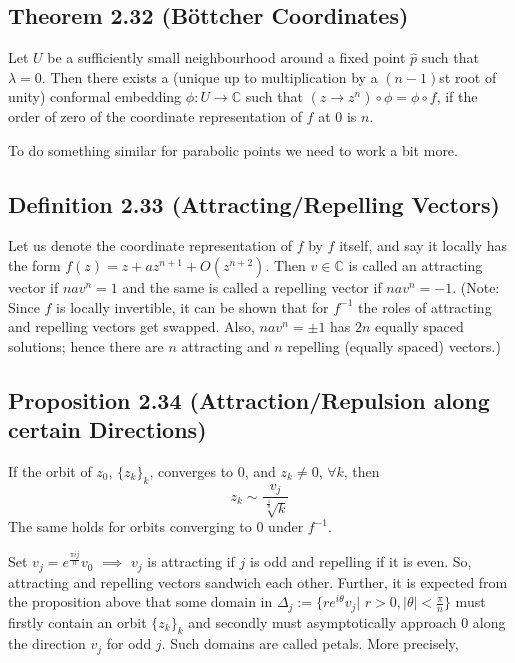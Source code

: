 \documentclass[11pt,a4paper]{article}
\begin{document}

        \subsection*{Theorem 2.32 (B\"ottcher Coordinates)} Let $U$ be a sufficiently small neighbourhood around a fixed point $\hat{p}$ such that $\lambda = 0$. Then there exists a (unique up to multiplication by a $(n-1)$st root of unity) conformal embedding $\phi: U \rightarrow \mathbb{C}$ such that $(z \rightarrow z^n) \circ \phi = \phi \circ f$, if the order of zero of the coordinate representation of $f$ at $0$ is $n$.



        To do something similar for parabolic points we need to work a bit more.

        \subsection*{Definition 2.33 (Attracting/Repelling Vectors)} Let us denote the coordinate representation of $f$ by $f$ itself, and say it locally has the form $f(z) = z + az^{n+1} + O(z^{n+2})$. Then $v \in \mathbb{C}$ is called an attracting vector if $nav^n = 1$ and the same is called a repelling vector if $nav^n = -1$. (Note: Since $f$ is locally invertible, it can be shown that for $f^{-1}$ the roles of attracting and repelling vectors get swapped. Also, $nav^n = \pm 1$ has $2n$ equally spaced solutions; hence there are $n$ attracting and $n$ repelling (equally spaced) vectors.)


        \subsection*{Proposition 2.34 (Attraction/Repulsion along certain Directions)} If the orbit of $z_0$, $\{z_k\}_k$, converges to $0$, and $z_k \neq 0$, $\forall k$, then $$z_k \sim \frac{v_j}{\sqrt[\frac{1}{n}]{k}}$$ The same holds for orbits converging to $0$ under $f^{-1}$.



       Set $v_j = e^{\frac{\pi i j}{n}}v_0$ $\implies$ $v_j$ is attracting if $j$ is odd and repelling if it is even. So, attracting and repelling vectors sandwich each other. Further, it is expected from the proposition above that some domain in $\Delta_j := \{re^{i\theta}v_j|$ $r>0, |\theta| < \frac{\pi}{n}\}$ must firstly contain an orbit $\{z_k\}_k$ and secondly must asymptotically approach $0$ along the direction $v_j$ for odd $j$. Such domains are called petals. More precisely,
\end{document}
